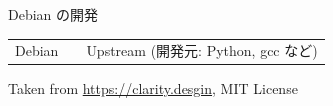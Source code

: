 \begin{frame}[fragile]{Debian の開発}
\begin{center}
\begin{tabular}{ccc}
	\\
	Debian & & Upstream {\tiny(開発元: Python, gcc など)}
	\end{tabular}
	\end{center}

	\hspace{1em}
	Taken from \url{https://clarity.desgin}, MIT License
\end{frame}

